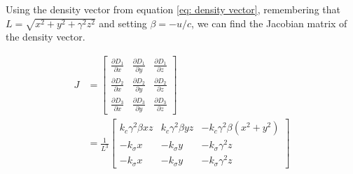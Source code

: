 

Using the density vector from equation \eqref{eq: density vector}, remembering that $ L=\sqrt{x^2+y^2+\gamma^2 z^2}$ and setting $\beta = - u/c$, we can find the Jacobian matrix of the density vector.

\begin{derivation}


	\begin{equation}
		\begin{aligned}
			J & =
			\begin{bmatrix}
				\frac{\partial D_{1}}{\partial x} & \frac{\partial D_{1}}{\partial y} & \frac{\partial D_{1}}{\partial z} \\
				\frac{\partial D_{2}}{\partial x} & \frac{\partial D_{2}}{\partial y} & \frac{\partial D_{2}}{\partial z} \\
				\frac{\partial D_{3}}{\partial x} & \frac{\partial D_{3}}{\partial y} & \frac{\partial D_{3}}{\partial z}
			\end{bmatrix}
			\\
			  & =  \frac{1}{L^3}
			\begin{bmatrix}
				k_c \gamma^2 \beta xz & k_c \gamma^2 \beta yz & - k_c \gamma^2 \beta (x^2 +y^2) \\
				-k_\sigma x           & -k_\sigma y           & -k_\sigma\gamma^2 z             \\
				-k_\sigma x           & -k_\sigma y           & -k_\sigma\gamma^2 z
			\end{bmatrix}
		\end{aligned}
	\end{equation}


\end{derivation}
